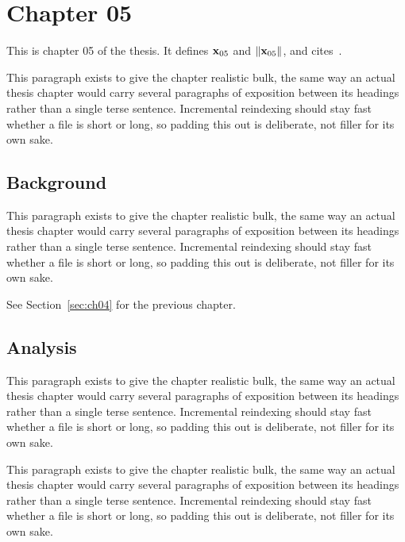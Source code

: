 \section{Chapter 05}
\label{sec:ch05}

This is chapter 05 of the thesis. It defines $\mathbf{x}_{05}$ and $\lVert \mathbf{x}_{05} \rVert$, and cites~\cite{ref1}.

This paragraph exists to give the chapter realistic bulk, the same way an actual thesis chapter would carry several paragraphs of exposition between its headings rather than a single terse sentence. Incremental reindexing should stay fast whether a file is short or long, so padding this out is deliberate, not filler for its own sake.

\subsection{Background}
\label{sec:ch05:background}

This paragraph exists to give the chapter realistic bulk, the same way an actual thesis chapter would carry several paragraphs of exposition between its headings rather than a single terse sentence. Incremental reindexing should stay fast whether a file is short or long, so padding this out is deliberate, not filler for its own sake.

See Section~\ref{sec:ch04} for the previous chapter.

\subsection{Analysis}
\label{sec:ch05:analysis}

This paragraph exists to give the chapter realistic bulk, the same way an actual thesis chapter would carry several paragraphs of exposition between its headings rather than a single terse sentence. Incremental reindexing should stay fast whether a file is short or long, so padding this out is deliberate, not filler for its own sake.

This paragraph exists to give the chapter realistic bulk, the same way an actual thesis chapter would carry several paragraphs of exposition between its headings rather than a single terse sentence. Incremental reindexing should stay fast whether a file is short or long, so padding this out is deliberate, not filler for its own sake.
